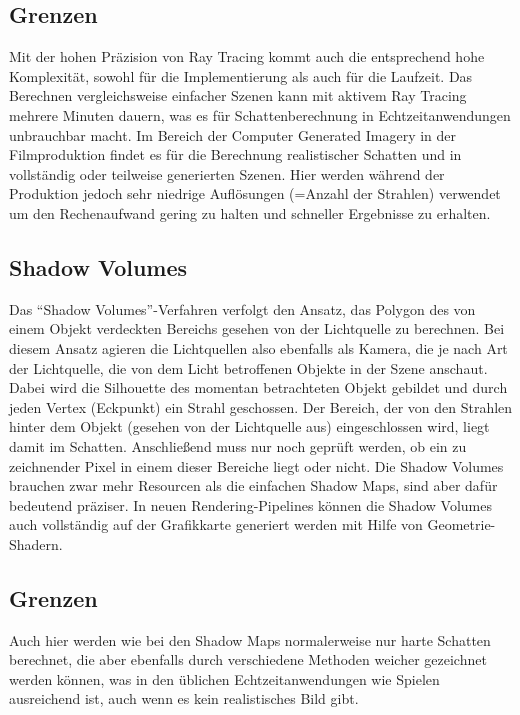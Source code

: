 \subsection*{Grenzen}

Mit der hohen Präzision von Ray Tracing kommt auch die entsprechend hohe Komplexität, sowohl für die
Implementierung als auch für die Laufzeit. Das Berechnen vergleichsweise einfacher Szenen kann mit
aktivem Ray Tracing mehrere Minuten dauern, was es für Schattenberechnung in Echtzeitanwendungen
unbrauchbar macht. Im Bereich der Computer Generated Imagery in der Filmproduktion findet es für die
Berechnung realistischer Schatten und in vollständig oder teilweise generierten Szenen. Hier werden
während der Produktion jedoch sehr niedrige Auflösungen (=Anzahl der Strahlen) verwendet um den
Rechenaufwand gering zu halten und schneller Ergebnisse zu erhalten.

\subsection{Shadow Volumes}

Das "`Shadow Volumes"'-Verfahren verfolgt den Ansatz, das Polygon des von einem Objekt verdeckten Bereichs
gesehen von der Lichtquelle zu berechnen. Bei diesem Ansatz agieren die Lichtquellen also ebenfalls als
Kamera, die je nach Art der Lichtquelle, die von dem Licht betroffenen Objekte in der Szene anschaut.
Dabei wird die Silhouette des momentan betrachteten Objekt gebildet und durch jeden Vertex (Eckpunkt)
ein Strahl geschossen. Der Bereich, der von den Strahlen hinter dem Objekt (gesehen von der Lichtquelle
aus) eingeschlossen wird, liegt damit im Schatten. Anschließend muss nur noch geprüft werden, ob ein zu
zeichnender Pixel in einem dieser Bereiche liegt oder nicht. Die Shadow Volumes brauchen zwar mehr
Resourcen als die einfachen Shadow Maps, sind aber dafür bedeutend präziser. In neuen Rendering-Pipelines
können die Shadow Volumes auch vollständig auf der Grafikkarte generiert werden mit Hilfe von
Geometrie-Shadern.

\subsection*{Grenzen}

Auch hier werden wie bei den Shadow Maps normalerweise nur harte Schatten berechnet, die aber ebenfalls
durch verschiedene Methoden weicher gezeichnet werden können, was in den üblichen Echtzeitanwendungen wie
Spielen ausreichend ist, auch wenn es kein realistisches Bild gibt.
